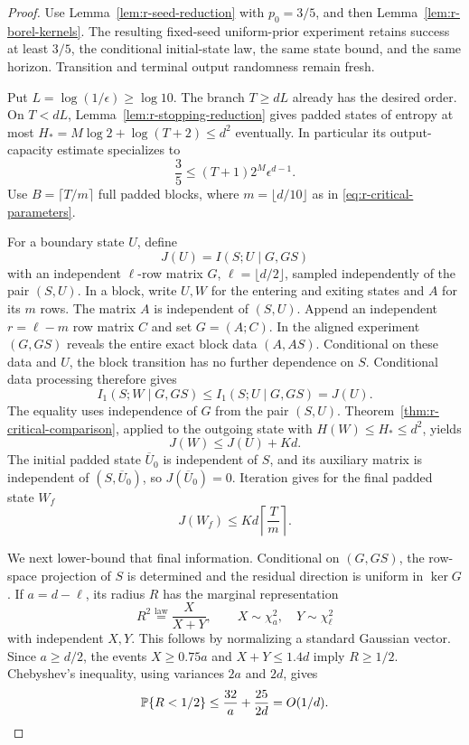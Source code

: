 \begin{proof}
Use Lemma~\ref{lem:r-seed-reduction} with \(p_0=3/5\), and then
Lemma~\ref{lem:r-borel-kernels}.  The resulting fixed-seed
uniform-prior experiment retains success at least \(3/5\), the
conditional initial-state law, the same state bound, and the same
horizon.  Transition and terminal output randomness remain fresh.

Put \(L=\log(1/\epsilon)\ge\log10\).  The branch
\(T\ge dL\) already has the desired order.  On \(T<dL\),
Lemma~\ref{lem:r-stopping-reduction} gives padded states of entropy
at most \(H_*=M\log2+\log(T+2)\le d^2\) eventually.  In
particular its output-capacity estimate specializes to
\begin{equation}\label{eq:r-critical-output-capacity}
 \frac35\le(T+1)2^M\epsilon^{d-1}.
\end{equation}
Use \(B=\lceil T/m\rceil\) full padded blocks, where
\(m=\lfloor d/10\rfloor\) as in
\eqref{eq:r-critical-parameters}.

For a boundary state \(U\), define
\[
 J(U)=I(S;U\mid G,GS)
\]
with an independent \(\ell\)-row matrix \(G\),
\(\ell=\lfloor d/2\rfloor\), sampled independently of the pair
\((S,U)\).  In a block, write \(U,W\) for the entering and exiting
states and \(A\) for its \(m\) rows.  The matrix \(A\) is independent
of \((S,U)\).  Append an independent \(r=\ell-m\) row matrix \(C\)
and set \(G=(A;C)\).  In the aligned experiment \((G,GS)\) reveals
the entire exact block data \((A,AS)\).  Conditional on these data
and \(U\), the block transition has no further dependence on \(S\).
Conditional data processing therefore gives
\[
 I_1(S;W\mid G,GS)
 \le I_1(S;U\mid G,GS)=J(U).
\]
The equality uses independence of \(G\) from the pair \((S,U)\).
Theorem~\ref{thm:r-critical-comparison}, applied to the outgoing
state with \(H(W)\le H_*\le d^2\), yields
\[
 J(W)\le J(U)+Kd.
\]
The initial padded state \(\overline U_0\) is independent of \(S\),
and its auxiliary matrix is independent of
\((S,\overline U_0)\), so \(J(\overline U_0)=0\).  Iteration gives
for the final padded state \(W_f\)
\begin{equation}\label{eq:r-critical-iteration}
 J(W_f)\le Kd\left\lceil\frac{T}{m}\right\rceil .
\end{equation}

We next lower-bound that final information.  Conditional on
\((G,GS)\), the row-space projection of \(S\) is determined and
the residual direction is uniform in \(\ker G\).  If
\(a=d-\ell\), its radius \(R\) has the marginal representation
\[
 R^2\stackrel{\mathrm{law}}=\frac{X}{X+Y},
 \qquad X\sim\chi_a^2,\quad Y\sim\chi_\ell^2
\]
with independent \(X,Y\).  This follows by normalizing a standard
Gaussian vector.  Since \(a\ge d/2\), the events
\(X\ge0.75a\) and \(X+Y\le1.4d\) imply \(R\ge1/2\).
Chebyshev's inequality, using variances \(2a\) and \(2d\), gives
\begin{equation}\label{eq:r-critical-radius-tail}
 \mathbb P\{R<1/2\}
 \le\frac{32}{a}+\frac{25}{2d}=O(1/d).
\end{equation}


\end{proof}
